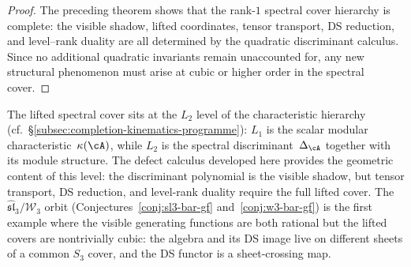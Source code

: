 \begin{proof}
The preceding theorem shows that the rank-$1$ spectral cover
hierarchy is complete: the visible shadow, lifted coordinates,
tensor transport, DS reduction, and level--rank duality are all
determined by the quadratic discriminant calculus.  Since no
additional quadratic invariants remain unaccounted for, any new
structural phenomenon must arise at cubic or higher order in the
spectral cover.
\end{proof}

\begin{remark}
\label{rem:spectral-shadow-position}
The lifted spectral cover sits at the $L_2$ level of the
characteristic hierarchy
(cf.~\S\ref{subsec:completion-kinematics-programme}): $L_1$ is the scalar
modular characteristic~$\kappa(\cA)$, while $L_2$ is the
spectral discriminant~$\Delta_\cA$ together with its module
structure.  The defect calculus developed here provides the
geometric content of this level: the discriminant polynomial is
the visible shadow, but tensor transport, DS reduction, and
level-rank duality require the full lifted cover.
The $\widehat{\mathfrak{sl}}_3/\mathcal{W}_3$ orbit
(Conjectures~\ref{conj:sl3-bar-gf}
and~\ref{conj:w3-bar-gf}) is the first example where the
visible generating functions are both rational but the lifted
covers are nontrivially cubic: the algebra and its DS image
live on different sheets of a common $S_3$ cover, and the DS
functor is a sheet-crossing map.
\end{remark}
